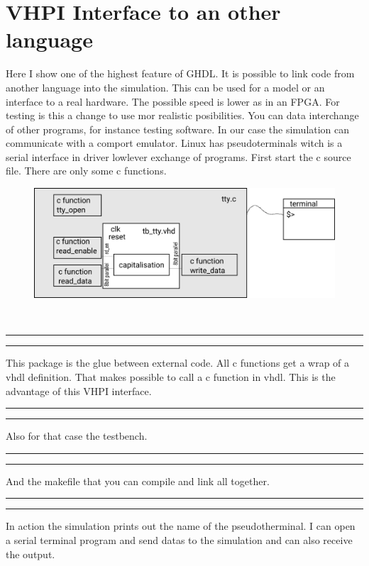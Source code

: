\documentclass[a4paper,11pt]{article}
\begin{document}
\section{VHPI Interface to an other language}
Here I show one of the highest feature of GHDL. It is possible to link code from another language into the simulation. This can be used for a model or an interface to a real hardware. The possible speed is lower as in an FPGA. For testing is this a change to use mor realistic posibilities. You can data interchange of other programs, for instance testing software. In our case the simulation can communicate with a comport emulator. Linux has pseudoterminals witch is a serial interface in driver lowlever exchange of programs. 
First start the c source file. There are only some c functions.
\begin{figure}[H]
  \begin{center}
    \includegraphics[scale=0.4]{vhpi/zeichnung.png}
  \end{center}
\end{figure}
\vspace{10pt}
\\
\hrule

\hrule
\vspace{10pt}

This package is the glue between external code. All c functions get a wrap of a vhdl definition. That makes possible to call a c function in vhdl. This is the advantage of this VHPI interface.
\vspace{10pt}
\hrule

\hrule
\vspace{10pt}
Also for that case the testbench.
\vspace{10pt}
\\
\hrule

\hrule
\vspace{10pt}
And the makefile that you can compile and link all together.
\hrule
{}
\hrule
\vspace{10pt}
In action the simulation prints out the name of the pseudotherminal. I can open a serial terminal program and send datas to the simulation and can also receive the output.
\end{document}
